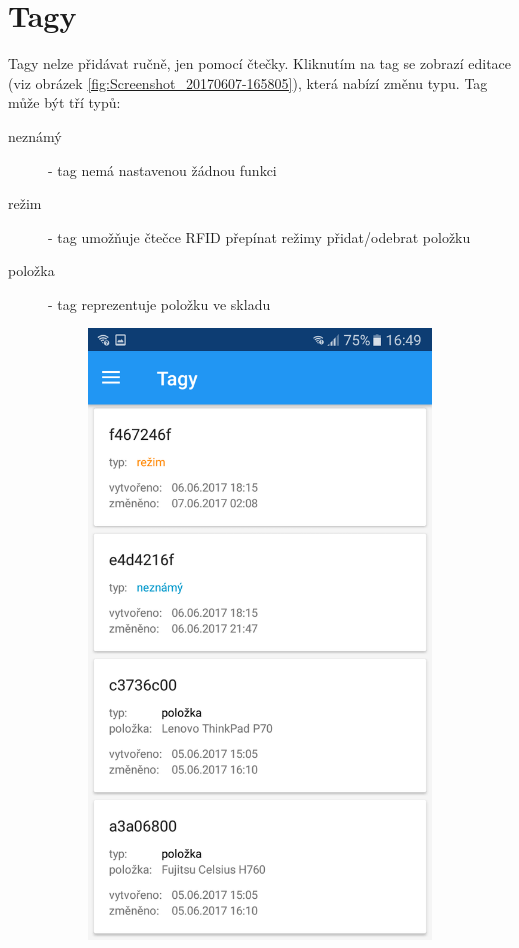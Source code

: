 \documentclass[12pt]{report}
\begin{document}
\section{Tagy}
Tagy nelze přidávat ručně, jen pomocí čtečky. Kliknutím na tag se zobrazí editace (viz obrázek \ref{fig:Screenshot_20170607-165805}), která nabízí změnu typu. Tag může být tří typů:
\begin{description}
\item [neznámý] - tag nemá nastavenou žádnou funkci
\item [režim] - tag umožňuje čtečce RFID přepínat režimy přidat/odebrat položku
\item [položka] - tag reprezentuje položku ve skladu 
\end{description}
\begin{figure}[H]
	\centering
  \begin{subfigure}[b]{0.3\textwidth}
    \centering
	\includegraphics[width=\textwidth]{../images/client_android/Screenshot_20170607-164958.png}	

\end{subfigure}
\end{figure}
\end{document}
